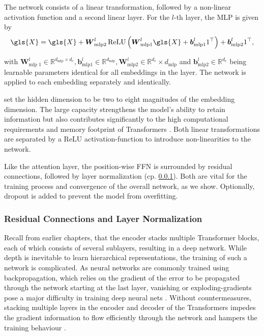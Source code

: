 The network consists of a linear transformation, followed by a non-linear activation function and a second linear layer. For the $l$-th layer, the \gls{MLP} is given by
\begin{equation}
    \gls{X} = \gls{X}+\boldsymbol{W}_{\mathrm{mlp} 2}^l \operatorname{ReLU}\left(\boldsymbol{W}_{\mathrm{mlp} 1}^l \gls{X}+\boldsymbol{b}_{\mathrm{mlp} 1}^l 1^{\top}\right)+\boldsymbol{b}_{\mathrm{mlp} 2}^l 1^{\top},
\end{equation}

with $\boldsymbol{W}_{\text {mlp } 1}^l \in \mathbb{R}^{d_{\mathrm{mlp}} \times d_{e}}, \boldsymbol{b}_{\mathrm{mlp} 1}^l \in \mathbb{R}^{d_{\mathrm{mlp}}}, \boldsymbol{W}_{\mathrm{mlp} 2}^l \in \mathbb{R}^{d_{e}} \times d_{\mathrm{mlp}}$ and $\boldsymbol{b}_{\mathrm{mlp} 2}^l \in \mathbb{R}^{d_{e}}$ being learnable parameters identical for all \glspl{embedding} in the layer. The network is applied to each embedding separately and identically.

\textcite[][9]{vaswaniAttentionAllYou2017} set the hidden dimension to be two to eight magnitudes of the embedding dimension. The large capacity strengthens the model's ability to retain information but also contributes significantly to the high computational requirements and memory footprint of Transformers \autocites[][5]{tayEfficientTransformersSurvey2022}[][1]{kitaevReformerEfficientTransformer2020}. Both linear transformations are separated by a \gls{ReLU} \gls{activation-function} \autocite[][318]{glorotDeepSparseRectifier2011} to introduce non-linearities to the network.

Like the attention layer, the position-wise \gls{FFN} is surrounded by residual connections, followed by layer normalization (cp. \cref{sec:residual-connections-layer-norm}). Both are vital for the training process and convergence of the overall network, as we show. Optionally, dropout \autocite[][1930]{srivastavaDropoutSimpleWay} is added to prevent the model from \gls{overfitting}.

\subsubsection{Residual Connections and Layer Normalization}\label{sec:residual-connections-layer-norm}

Recall from earlier chapters, that the encoder stacks multiple Transformer blocks, each of which consists of several sublayers, resulting in a deep network. While depth is inevitable to learn hierarchical representations, the training of such a network is complicated. As neural networks are commonly trained using backpropagation, which relies on the gradient of the error to be propagated through the network starting at the last layer, vanishing or \glspl{exploding-gradient} pose a major difficulty in training deep neural nets \autocite[][1]{heDeepResidualLearning2015}. Without countermeasures, stacking multiple layers in the encoder and decoder of the Transformers impedes the gradient information to flow efficiently through the network and hampers the training behaviour \autocite[][1811]{wangLearningDeepTransformer2019}.

